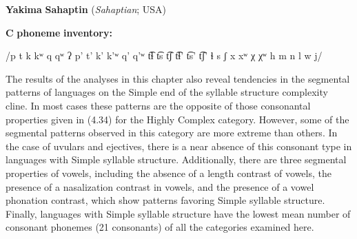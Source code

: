 \ea\label{ex:(4.35)}
   \textbf{Yakima} \textbf{Sahaptin} (\textit{Sahaptian}; USA)



\textbf{C} \textbf{phoneme} \textbf{inventory:} 



/p t k kʷ q qʷ ʔ p’ t’ k’ k’ʷ q’ q’ʷ t͡ɬ t͡s t͡ʃ t͡ɬ’ t͡s’ t͡ʃ’ ɬ s ʃ x xʷ χ χʷ h m n l w j/

\z


  The results of the analyses in this chapter also reveal tendencies in the segmental patterns of languages on the Simple end of the syllable structure complexity cline. In most cases these patterns are the opposite of those consonantal properties given in (4.34) for the Highly Complex category. However, some of the segmental patterns observed in this category are more extreme than others. In the case of uvulars and ejectives, there is a near absence of this consonant type in languages with Simple syllable structure. Additionally, there are three segmental properties of vowels, including the absence of a length contrast of vowels, the presence of a nasalization contrast in vowels, and the presence of a vowel phonation contrast, which show patterns favoring Simple syllable structure. Finally, languages with Simple syllable structure have the lowest mean number of consonant phonemes (21 consonants) of all the categories examined here.



